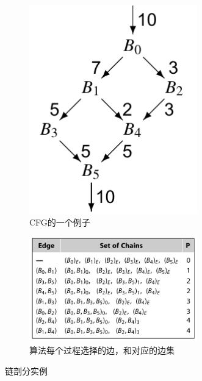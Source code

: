 \begin{figure}[H]
    \centering
    \begin{subfigure}[b]{0.3\textwidth}
        \centering
        \includegraphics[width=0.8\textwidth]{images/example_cfg.png}
        \caption{CFG的一个例子\cite{cooper2011engineering}}
    \end{subfigure}
    \begin{subfigure}[b]{0.6\textwidth}
        \centering
        \includegraphics[width=0.8\textwidth]{images/greedy.png}
        \caption{算法每个过程选择的边，和对应的边集}
    \end{subfigure}
    \caption{链剖分实例}
\end{figure}